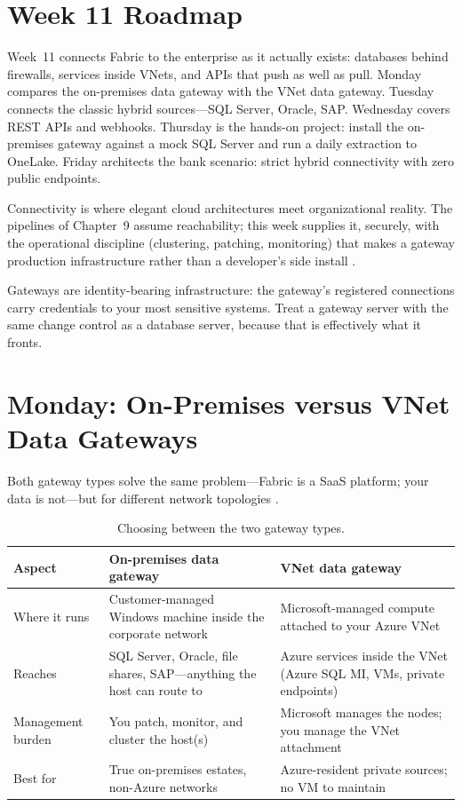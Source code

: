 \section{Week 11 Roadmap}
Week~11 connects Fabric to the enterprise as it actually exists: databases behind firewalls, services inside VNets, and APIs that push as well as pull. Monday compares the on-premises data gateway with the VNet data gateway. Tuesday connects the classic hybrid sources---SQL Server, Oracle, SAP. Wednesday covers REST APIs and webhooks. Thursday is the hands-on project: install the on-premises gateway against a mock SQL Server and run a daily extraction to OneLake. Friday architects the bank scenario: strict hybrid connectivity with zero public endpoints.

Connectivity is where elegant cloud architectures meet organizational reality. The pipelines of Chapter~9 assume reachability; this week supplies it, securely, with the operational discipline (clustering, patching, monitoring) that makes a gateway production infrastructure rather than a developer's side install \cite{microsoftOnPremGateway,microsoftVNetGateway}.

\begin{notebox}
Gateways are identity-bearing infrastructure: the gateway's registered connections carry credentials to your most sensitive systems. Treat a gateway server with the same change control as a database server, because that is effectively what it fronts.
\end{notebox}

\section{Monday: On-Premises versus VNet Data Gateways}
Both gateway types solve the same problem---Fabric is a SaaS platform; your data is not---but for different network topologies \cite{microsoftOnPremGateway,microsoftVNetGateway}.

\begin{table}[H]
\centering
\small
\begin{tabular}{@{}p{3.6cm}p{5.0cm}p{5.0cm}@{}}
\toprule
\textbf{Aspect} & \textbf{On-premises data gateway} & \textbf{VNet data gateway} \\
\midrule
Where it runs & Customer-managed Windows machine inside the corporate network & Microsoft-managed compute attached to your Azure VNet \\
Reaches & SQL Server, Oracle, file shares, SAP---anything the host can route to & Azure services inside the VNet (Azure SQL MI, VMs, private endpoints) \\
Management burden & You patch, monitor, and cluster the host(s) & Microsoft manages the nodes; you manage the VNet attachment \\
Best for & True on-premises estates, non-Azure networks & Azure-resident private sources; no VM to maintain \\
\bottomrule
\end{tabular}
\caption{Choosing between the two gateway types.}
\label{tab:chapter11-gateways}
\end{table}


